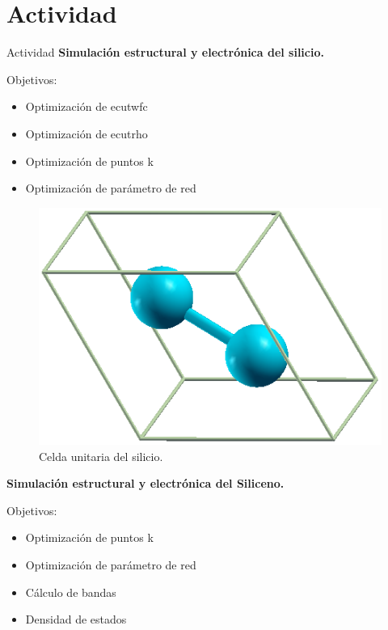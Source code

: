 \section{Actividad}

\begin{frame}{Actividad}
    \textbf{Simulación estructural y electrónica del silicio.}

    \vspace{0.4cm}

    Objetivos:

    \begin{itemize}
        \item Optimización de ecutwfc
        \item Optimización de ecutrho
        \item Optimización de puntos k
        \item Optimización de parámetro de red
    \end{itemize}
\end{frame}

\begin{frame}
    \begin{figure}[H]
        \centering
        \includegraphics[scale=0.6]{images/silicene_cell.png}
        \caption{Celda unitaria del silicio.}
    \end{figure}
\end{frame}

\begin{frame}
    \textbf{Simulación estructural y electrónica del Siliceno.}

    \vspace{0.4cm}

    Objetivos:

    \begin{itemize}
        \item Optimización de puntos k
        \item Optimización de parámetro de red
        \item Cálculo de bandas
        \item Densidad de estados
    \end{itemize}
\end{frame}

